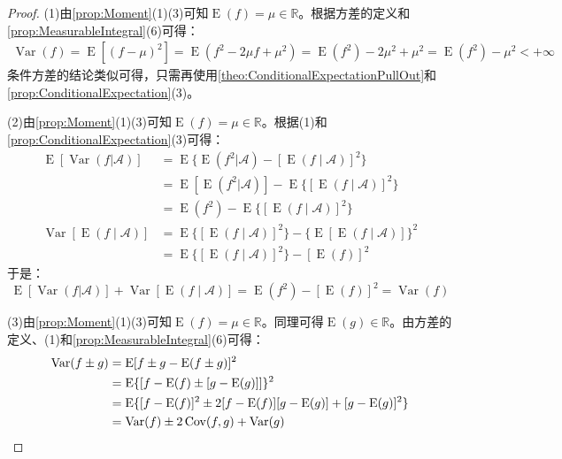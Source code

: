 \begin{proof}
	(1)由\cref{prop:Moment}(1)(3)可知$\operatorname{E}(f)=\mu\in\mathbb{R}$。根据方差的定义和\cref{prop:MeasurableIntegral}(6)可得：
	\begin{align*}
		\operatorname{Var}(f)=\operatorname{E}[(f-\mu)^2]=\operatorname{E}(f^2-2\mu f+\mu^2)=\operatorname{E}(f^2)-2\mu^2+\mu^2=\operatorname{E}(f^2)-\mu^2<+\infty
	\end{align*}
	条件方差的结论类似可得，只需再使用\cref{theo:ConditionalExpectationPullOut}和\cref{prop:ConditionalExpectation}(3)。\par
	(2)由\cref{prop:Moment}(1)(3)可知$\operatorname{E}(f)=\mu\in\mathbb{R}$。根据(1)和\cref{prop:ConditionalExpectation}(3)可得：
	\begin{align*}
		\operatorname{E}[\operatorname{Var}(f|\mathscr{A})]
		&=\operatorname{E}\{\operatorname{E}(f^2|\mathscr{A})-[\operatorname{E}(f\mid\mathscr{A})]^2\} \\
		&=\operatorname{E}[\operatorname{E}(f^2|\mathscr{A})]-\operatorname{E}\{[\operatorname{E}(f\mid\mathscr{A})]^2\} \\
		&=\operatorname{E}(f^2)-\operatorname{E}\{[\operatorname{E}(f\mid\mathscr{A})]^2\} \\
		\operatorname{Var}[\operatorname{E}(f\mid\mathscr{A})]
		&=\operatorname{E}\{[\operatorname{E}(f\mid\mathscr{A})]^2\}-\{\operatorname{E}[\operatorname{E}(f\mid\mathscr{A})]\}^2 \\
		&=\operatorname{E}\{[\operatorname{E}(f\mid\mathscr{A})]^2\}-[\operatorname{E}(f)]^2
	\end{align*}
	于是：
	\begin{equation*}
		\operatorname{E}[\operatorname{Var}(f|\mathscr{A})]+\operatorname{Var}[\operatorname{E}(f\mid \mathscr{A})]=\operatorname{E}(f^2)-[\operatorname{E}(f)]^2=\operatorname{Var}(f)
	\end{equation*}\par
	(3)由\cref{prop:Moment}(1)(3)可知$\operatorname{E}(f)=\mu\in\mathbb{R}$。同理可得$\operatorname{E}(g)\in\mathbb{R}$。由方差的定义、(1)和\cref{prop:MeasurableIntegral}(6)可得：
	\begin{align*}
		\operatorname{Var}(f\pm g)
		&=\operatorname{E}[f\pm g-\operatorname{E}(f\pm g)]^2 \\
		&=\operatorname{E}\{[f-\operatorname{E}(f)\pm[g-\operatorname{E}(g)]]\}^2 \\
		&=\operatorname{E}\{[f-\operatorname{E}(f)]^2\pm 2[f-\operatorname{E}(f)][g-\operatorname{E}(g)]+[g-\operatorname{E}(g)]^2\} \\
		&=\operatorname{Var}(f)\pm2\operatorname{Cov}(f,g)+\operatorname{Var}(g)\qedhere
	\end{align*}
\end{proof}

